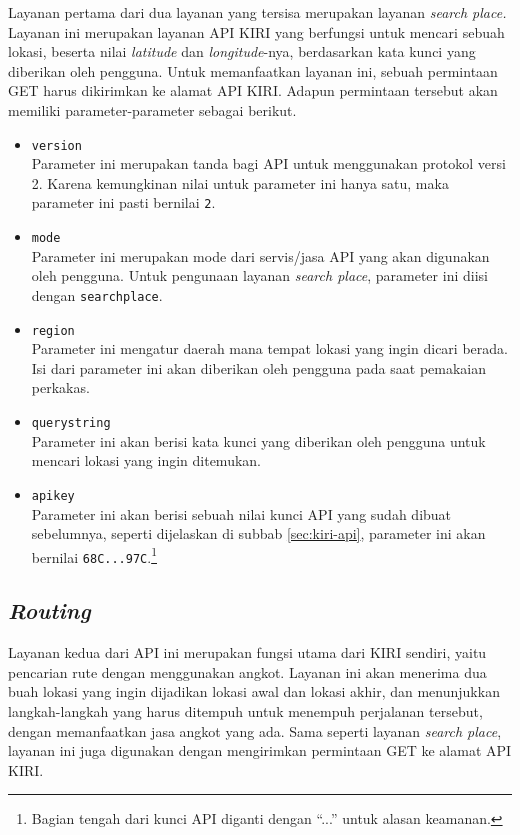 Layanan pertama dari dua layanan yang tersisa merupakan layanan \textit{search place.} Layanan ini merupakan layanan API KIRI yang berfungsi untuk mencari sebuah lokasi, beserta nilai \textit{latitude} dan \textit{longitude}-nya, berdasarkan kata kunci yang diberikan oleh pengguna. Untuk memanfaatkan layanan ini, sebuah permintaan GET harus dikirimkan ke alamat API KIRI. Adapun permintaan tersebut akan memiliki parameter-parameter sebagai berikut.

\begin{itemize}
	\item \verb|version|\\
	Parameter ini merupakan tanda bagi API untuk menggunakan protokol versi 2. Karena kemungkinan nilai untuk parameter ini hanya satu, maka parameter ini pasti bernilai \verb|2|.
	\item \verb|mode|\\
	Parameter ini merupakan mode dari servis/jasa API yang akan digunakan oleh pengguna. Untuk pengunaan layanan \textit{search place}, parameter ini diisi dengan \verb|searchplace|.
	\item \verb|region|\\
	Parameter ini mengatur daerah mana tempat lokasi yang ingin dicari berada. Isi dari parameter ini akan diberikan oleh pengguna pada saat pemakaian perkakas.
	\item \verb|querystring|\\
	Parameter ini akan berisi kata kunci yang diberikan oleh pengguna untuk mencari lokasi yang ingin ditemukan.
	\item \verb|apikey|\\
	Parameter ini akan berisi sebuah nilai kunci API yang sudah dibuat sebelumnya, seperti dijelaskan di subbab \ref{sec:kiri-api}, parameter ini akan bernilai \verb|68C...97C|.\footnote{Bagian tengah dari kunci API diganti dengan ``...'' untuk alasan keamanan.}
\end{itemize}

\subsection{\textit{Routing}}
\label{sec:analysis-kiri-findroute}

Layanan kedua dari API ini merupakan fungsi utama dari KIRI sendiri, yaitu pencarian rute dengan menggunakan angkot. Layanan ini akan menerima dua buah lokasi yang ingin dijadikan lokasi awal dan lokasi akhir, dan menunjukkan langkah-langkah yang harus ditempuh untuk menempuh perjalanan tersebut, dengan memanfaatkan jasa angkot yang ada. Sama seperti layanan \textit{search place}, layanan ini juga digunakan dengan mengirimkan permintaan GET ke alamat API KIRI.

